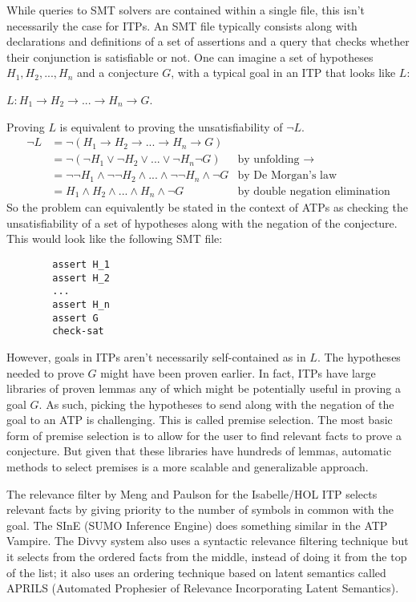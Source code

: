 \documentclass{article}
\begin{document}
	While queries to SMT solvers are contained within a single 
	file, this isn't necessarily the case for ITPs. An SMT file
	typically consists along with declarations and definitions 
	of a set of assertions and a query that checks whether 
	their conjunction is satisfiable or not. 
	One can imagine a set of hypotheses 
	$H_1, H_2, ..., H_n$ and a conjecture $G$, with a 
	typical goal in an ITP that looks like $L$:
	\begin{center}
		$L : H_1 \to H_2 \to ... \to H_n \to G$.
	\end{center}
	Proving $L$ is equivalent to proving the unsatisfiability 
	of $\neg L$.
	\begin{align*}
		\neg L &= \neg (H_1 \to H_2 \to ... \to H_n \to G)\\
		&= \neg (\neg H_1 \lor \neg H_2 \lor ... \lor \neg H_n \neg G)
		& \text{by unfolding }\to \\
		&= \neg \neg H_1 \land \neg \neg H_2 \land ... \land \neg \neg H_n 
			\land \neg G
		& \text{by De Morgan's law}\\
		&= H_1 \land H_2 \land ... \land H_n \land \neg G
		& \text{by double negation elimination}
	\end{align*}
	So the problem can equivalently be stated in the context of ATPs
	as checking the unsatisfiability of a set of hypotheses 
	along with the negation of the conjecture. This would look 
	like the following SMT file:
	\begin{verbatim}
		assert H_1
		assert H_2
		...
		assert H_n
		assert G
		check-sat
	\end{verbatim}
	However, goals in ITPs aren't necessarily self-contained 
	as in $L$. The hypotheses needed to prove $G$ 
	might have been proven earlier. In fact, ITPs have large
	libraries of proven lemmas any of which might be potentially 
	useful in proving a goal $G$. As such, picking
	the hypotheses to send along with the negation of the 
	goal to an ATP is challenging. This is called premise 
	selection. The most basic form of premise selection 
	is to allow for the user to find relevant facts 
	to prove a conjecture. But given that these libraries 
	have hundreds of lemmas, automatic methods to select 
	premises is a more scalable and generalizable approach.
	
	The relevance filter by Meng and Paulson 
	\cite{DBLP:journals/japll/MengP09}
	for the Isabelle/HOL ITP selects relevant facts by 
	giving priority to the number of symbols in common 
	with the goal. The SInE (SUMO Inference Engine) 
	\cite{10.1007/978-3-642-22438-6_23} does something 
	similar in the ATP Vampire. The Divvy system 
	\cite{10.1007/978-3-642-02959-2_13} also uses a 
	syntactic relevance filtering technique but it 
	selects from the ordered facts from the middle, 
	instead of doing it from the top of the list; it
	also uses an ordering technique based 
	on latent semantics called APRILS (Automated Prophesier 
	of Relevance Incorporating Latent Semantics).
	
\end{document}
